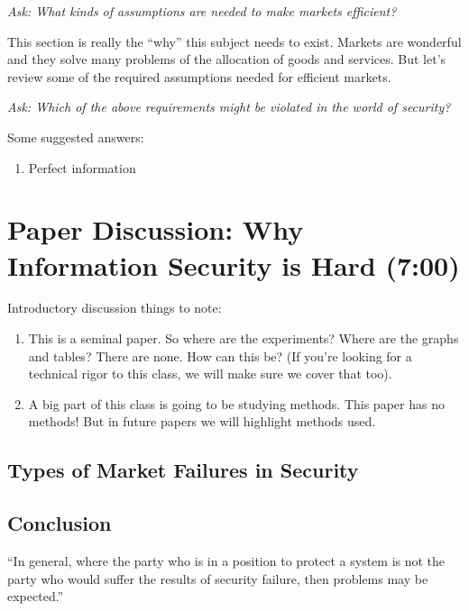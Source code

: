 \documentclass[11pt]{article}
\begin{document}
{\it Ask: What kinds of assumptions are needed to make markets efficient?}


This section is really the ``why'' this subject needs to exist. 
Markets are wonderful and they solve many problems of the allocation of goods and services.
But let's review some of the required assumptions needed for efficient markets.

{\it Ask: Which of the above requirements might be violated in the world of security?}

Some suggested answers:
\begin{enumerate}
    \item Perfect information
\end{enumerate}

\section{Paper Discussion: Why Information Security is Hard (7:00)}

Introductory discussion things to note:
\begin{enumerate}
    \item This is a seminal paper. So where are the experiments? Where are the graphs and tables? There are none. How can this be? (If you're looking for a technical rigor to this class, we will make sure we cover that too).
    \item A big part of this class is going to be studying methods. This paper has no methods! But in future papers we will highlight methods used. 
\end{enumerate}

\subsection{Types of Market Failures in Security}

\subsection{Conclusion}

“In general, where the party who is in a position to protect a system is not the party who would suffer the results of security failure, then problems may be expected.”
\end{document}

